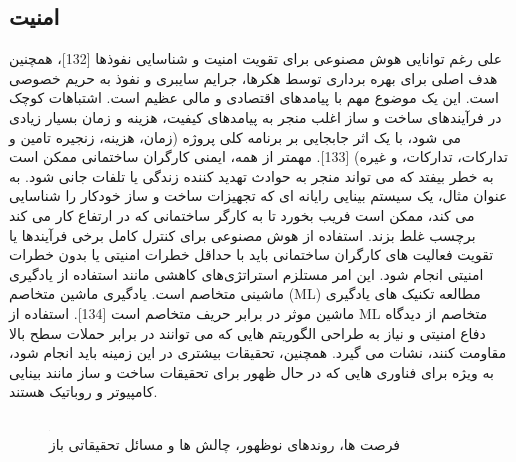 \documentclass[towcolumn, 11pt]{Article}
\begin{document}
\begin{چکیده}
\subsection{امنیت}
علی رغم توانایی هوش مصنوعی برای تقویت امنیت و شناسایی نفوذها [132]، همچنین هدف اصلی برای بهره برداری توسط هکرها، جرایم سایبری و نفوذ به حریم خصوصی است. این یک موضوع مهم با پیامدهای اقتصادی و مالی عظیم است. اشتباهات کوچک در فرآیندهای ساخت و ساز اغلب منجر به پیامدهای کیفیت، هزینه و زمان بسیار زیادی می شود، با یک اثر جابجایی بر برنامه کلی پروژه (زمان، هزینه، زنجیره تامین و تدارکات، تدارکات، و غیره) [133]. مهمتر از همه، ایمنی کارگران ساختمانی ممکن است به خطر بیفتد که می تواند منجر به حوادث تهدید کننده زندگی یا تلفات جانی شود. به عنوان مثال، یک سیستم بینایی رایانه ای که تجهیزات ساخت و ساز خودکار را شناسایی می کند، ممکن است فریب بخورد تا به کارگر ساختمانی که در ارتفاع کار می کند برچسب غلط بزند. استفاده از هوش مصنوعی برای کنترل کامل برخی فرآیندها یا تقویت فعالیت های کارگران ساختمانی باید با حداقل خطرات امنیتی یا بدون خطرات امنیتی انجام شود. این امر مستلزم استراتژی‌های کاهشی مانند استفاده از یادگیری ماشینی متخاصم است. یادگیری ماشین متخاصم (ML) مطالعه تکنیک های یادگیری ماشین موثر در برابر حریف متخاصم است [134]. استفاده از ML متخاصم از دیدگاه دفاع امنیتی و نیاز به طراحی الگوریتم هایی که می توانند در برابر حملات سطح بالا مقاومت کنند، نشات می گیرد. همچنین، تحقیقات بیشتری در این زمینه باید انجام شود، به ویژه برای فناوری هایی که در حال ظهور برای تحقیقات ساخت و ساز مانند بینایی کامپیوتر و روباتیک هستند.


\begin{figure}[h]
\centering
\includegraphics[width=1, height=1\linewidth]{Images/AI in Construction Industry.jpg}
\caption{فرصت ها، روندهای نوظهور، چالش ها و مسائل تحقیقاتی باز}
\label{شکل:AI in Construction Industry}
\end{figure}



\end{چکیده}
\end{document}
